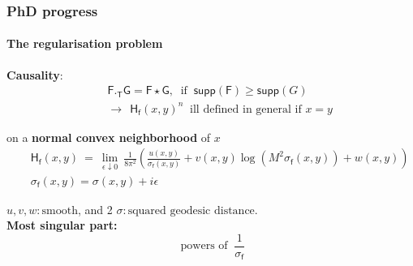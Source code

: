 \documentclass[9pt]{beamer}
\newcommand{\supp}{\mathsf{supp}} %
\newcommand{\Fsf}{\mathsf{F}}
\newcommand{\Gsf}{\mathsf{G}}
\newcommand{\Hsf}{\mathsf{H}}
\newcommand{\Tsf}{\mathsf{T}}
\newcommand{\fsf}{\mathsf{f}}
\begin{document}
\begin{frame}

\frametitle{PhD progress}
\framesubtitle{The regularisation problem}

\textbf{Causality}:  
\vspace*{-14pt}
\begin{eqnarray*}
&& \Fsf ._\Tsf \Gsf = \Fsf \star \Gsf, \ \mbox{ if } \ \supp(\Fsf) \geq \supp(G) \\
&& \to \ \ \Hsf_\fsf(x,y)^n \ \mbox{ ill defined in general if } x = y  
\end{eqnarray*}

\begin{exampleblock}{on a \textbf{normal convex neighborhood} of $x$} 
\vspace*{-18pt}
\begin{eqnarray*}
&& \Hsf_\fsf(x,y) \ = \ \lim_{\epsilon \downarrow 0} \ \frac{1}{8\pi^2}\left(\frac{u(x,y)}{\sigma_\fsf(x,y)} + v(x,y)\log(M^2 \sigma_\fsf(x,y)) + w(x,y) \right) \\[6pt]
&& \sigma_\fsf(x,y) = \sigma(x,y) + i\epsilon 
\end{eqnarray*}
\vspace*{-14pt}
\end{exampleblock}
%
\vspace*{-4pt}
$u,v,w:  \mbox{smooth}$, and 2 $\sigma: \mbox{squared geodesic distance}$. \\[8pt]
%
%
\textbf{Most singular part:}
\vspace*{-6pt}
\begin{equation*}
 \mbox{ powers of } \ \frac{1}{\sigma_\fsf}
\end{equation*}

\end{frame} 
\end{document}
